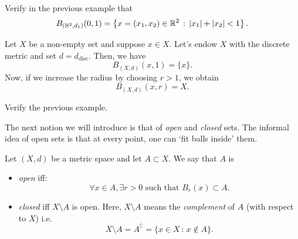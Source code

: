 \begin{ex}
	Verify in the previous example that
	\[
	B_{(\mathbb{R}^2,d_1)}(0,1) = \left\{
	x = (x_1,x_2)\in \mathbb{R}^2 \, : \, |x_1| + |x_2| < 1
	\right\}.
	\]
\end{ex}
\begin{eg}
	Let $X$ be a non-empty set and suppose $x\in X$. Let's endow $X$ with the discrete metric and set $d = d_\text{disc}$. Then, we have
	\[
	B_{(X,d)}(x,1) = \{ x \}.
	\]
	Now, if we increase the radius by choosing $r>1$, we obtain
	\[
	B_{(X,d)}(x,r) = X.
	\]
\end{eg}
\begin{ex}
	Verify the previous example.
\end{ex}
The next notion we will introduce is that of \textit{open} and \textit{closed} sets. The informal idea of open sets is that at every point, one can `fit balls inside' them.
\begin{defn}
	\label{defn:open_closed}
	Let $(X,d)$ be a metric space and let $A\subset X$. We say that $A$ is
	\begin{itemize}
		\item \textit{open} iff:
		\[
		\forall x \in A, \exists r>0\text{ such that }B_r(x) \subset A.
		\]
		\item \textit{closed} iff $X\setminus A$ is open. Here, $X\setminus A$ means the \textit{complement} of $A$ (with respect to $X$) i.e.
		\[
		X\setminus A = A^\complement = \{x \in X \, : \, x \notin A\}.
		\]
	\end{itemize}
\end{defn}

